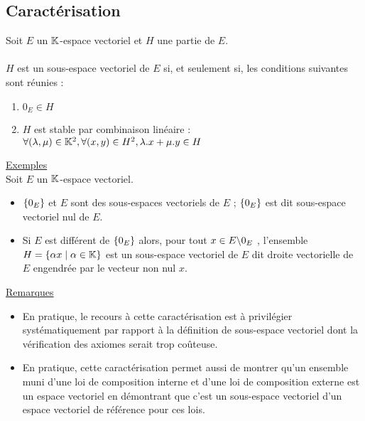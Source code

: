 \subsection{Caractérisation}
\begin{defprop}
    Soit \(E\) un \(\mathbb{K}\)-espace vectoriel et \(H\) une partie de \(E\).\\~\\
    \(H\) est un sous-espace vectoriel de \(E\) si, et seulement si, les conditions suivantes sont réunies :
    \begin{enumerate}
        \item \(0_E \in  H\) 
        \item \(H\) est stable par combinaison linéaire : \(\forall (\lambda, \mu ) \in  \mathbb{K}^2, \forall (x, y) \in  H^2, \lambda.x + \mu .y \in  H\)
    \end{enumerate}

    \underline{Exemples}\\
    Soit \(E\) un \(\mathbb{K}\)-espace vectoriel.\\
    \begin{itemize}
        \item \(\left\lbrace0_E \right\rbrace\) et \(E\) sont des sous-espaces vectoriels de \(E\) ; \(\left\lbrace0_E \right\rbrace\) est dit sous-espace vectoriel nul de \(E\).
        \item Si \(E\) est différent de \(\left\lbrace0_E \right\rbrace\) alors, pour tout \(x \in  E \backslash {0_E }\) , l’ensemble \(H = \left\lbrace\alpha x \;\middle|\; \alpha \in \mathbb{K}\right\rbrace\) est un sous-espace vectoriel de \(E\) dit droite vectorielle de \(E\) engendrée par le vecteur non nul \(x\).
    \end{itemize}
    \underline{Remarques}\\
    \begin{itemize}
        \item En pratique, le recours à cette caractérisation est à privilégier systématiquement par rapport à la définition de sous-espace vectoriel dont la vérification des axiomes serait trop coûteuse.
        \item En pratique, cette caractérisation permet aussi de montrer qu’un ensemble muni d’une loi de composition interne et d’une loi de composition externe est un espace vectoriel en démontrant que c’est un sous-espace vectoriel d’un espace vectoriel de référence pour ces lois.
    \end{itemize}
\end{defprop}

